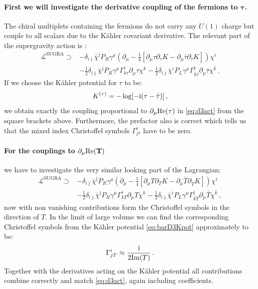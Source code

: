 \documentclass[a4paper,12pt]{report}
\newcommand{\be}{\begin{equation}}
\newcommand{\ee}{\end{equation}}
\newcommand{\bea}{\begin{equation}\begin{aligned}}
\newcommand{\eea}{\end{aligned}\end{equation}}
\def\rmi{{\rm i}}
\def\jb{{\bar \jmath}}
\def\rmre{{\rm Re}}
\def\rmim{{\rm Im}}
\begin{document}
\paragraph{First we will investigate the derivative coupling of the fermions to $\mathbf{\tau}$.} The chiral multiplets containing the fermions do not carry any $U(1)$ charge but couple to all scalars due to the Kähler covariant derivative. The relevant part of the supergravity action is \cite{Freedman:2012zz}:
\bea
\mathcal{L}^{\text{SUGRA}} \supset &-\delta_{i\jb}\bar{\chi}^\jb P_R \gamma^\mu \left(\partial_\mu - \frac{1}{4}[\partial_\mu \tau\partial_\tau K - \partial_\mu \bar{\tau}\partial_{\bar{\tau}} K] \right) \chi^i\\
&-\frac{1}{2} \delta_{i\jb} \bar{\chi}^\jb P_R \gamma^\mu \Gamma^i_{k\tau}\partial_\mu \tau \chi^k - \frac{1}{2} \delta_{i\jb} \bar{\chi}^i P_L \gamma^\mu \Gamma^\jb_{\bar{k}\bar{\tau}} \partial_\mu \bar{\tau} \chi^{\bar{k}}\,.
\eea 
If we choose the Kähler potential for $\tau$ to be:
\be 
K^{(\tau)} = - \log [-\rmi (\tau -\bar{\tau})]\,,
\ee
we obtain exactly the coupling proportional to $\partial_\mu \rmre(\tau)$ in \eqref{eq:d3act} from the square brackets above. Furthermore, the prefactor also is correct which tells us that the mixed index Christoffel symbols $\Gamma^i_{j\tau}$ have to be zero.
\paragraph{For the couplings to $\mathbf{\partial_\mu \rmre(T)}$} we have to investigate the very similar looking part of the Lagrangian:
\bea
\mathcal{L}^{\text{SUGRA}} \supset & - \delta_{i\jb} \bar{\chi}^\jb P_R \gamma^\mu \left( \partial_\mu -\frac{1}{4} [\partial_\mu T \partial_T K - \partial_\mu \bar{T} \partial_{\bar{T}} K]\right) \chi^i\\
&- \frac{1}{2} \delta_{i\jb} \bar{\chi}^\jb P_R \gamma^\mu \Gamma^i_{kT} \partial_\mu T \chi^k - \frac{1}{2} \delta_{i\jb} \bar{\chi}^i P_L \gamma^\mu \Gamma^{\jb}_{\bar{k}\bar{T}} \partial_\mu \bar{T} \chi^{\bar{k}}\,,
\eea
now with non vanishing contributions form the Christoffel symbols in the direction of $T$. In the limit of large volume we can find the corresponding Christoffel symbols from the Kähler potential \eqref{eq:barD3Kpot} approximately to be:
\be 
\Gamma^{i}_{jT} \approx \frac{\rmi}{2 \rmim(T)}\,.
\ee
Together with the derivatives acting on the Kähler potential all contributions combine correctly and match \eqref{eq:d3act}, again including coefficients.
\end{document}
